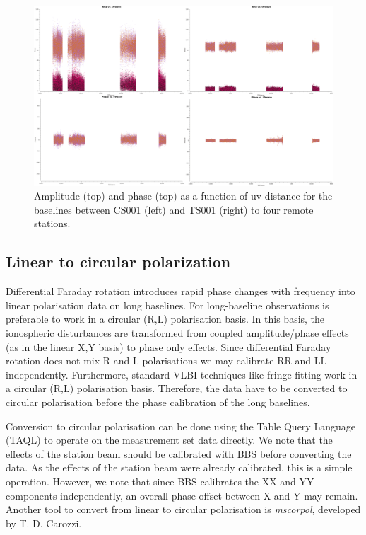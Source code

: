 \documentclass[graybox]{svmult}
\begin{document}
\begin{figure}
\begin{center}
\includegraphics[width=\textwidth]{figures/amp_uv_CSRS_TSRS.png}
\caption{Amplitude (top) and phase (top) as a function of uv-distance for the
baselines between CS001 (left) and TS001 (right) to four remote stations.}
\label{fig:CSvsTS}
\end{center}
\end{figure}


\subsection{Linear to circular polarization}

Differential Faraday rotation introduces rapid phase changes with frequency
into linear polarisation data on long baselines. For long-baseline observations
is preferable to work in a circular (R,L) polarisation basis. In this basis,
the ionospheric disturbances are transformed from coupled amplitude/phase
effects (as in the linear X,Y basis) to phase only effects. Since differential
Faraday rotation does not mix R and L polarisations we may calibrate RR and LL
independently. Furthermore, standard VLBI techniques like fringe fitting work
in a circular (R,L) polarisation basis. Therefore, the data have to be
converted to circular polarisation before the phase calibration of the long
baselines.

Conversion to circular polarisation can be done using the Table Query Language
(TAQL) to operate on the measurement set data directly. We note that the
effects of the station beam should be calibrated with BBS before converting the
data. As the effects of the station beam were already calibrated, this is a
simple operation. However, we note that since BBS calibrates the XX and YY
components independently, an overall phase-offset between X and Y may remain.
Another tool to convert from linear to circular polarisation is \emph{mscorpol}, 
developed by T. D. Carozzi.
\end{document}
